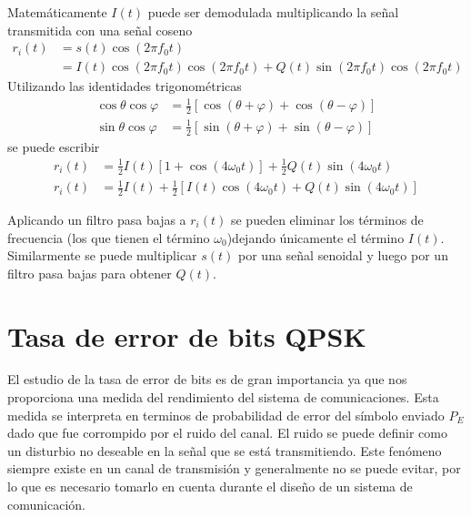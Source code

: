 Matem\'aticamente $I(t)$ puede ser demodulada multiplicando la se\~nal transmitida
con una se\~nal coseno
\begin{equation}
\begin{aligned}
r_i(t)&=s(t)\cos(2\pi f_0t)\\
&=I(t)\cos(2\pi f_0t)\cos(2\pi f_0t)+Q(t)\sin(2\pi f_0t)\cos(2\pi f_0t)
\end{aligned}
\end{equation}
Utilizando las identidades trigonom\'etricas
\begin{equation}
\begin{aligned}
\cos\theta\cos\varphi&=\frac{1}{2}[\cos(\theta+\varphi)+\cos(\theta-\varphi)]\\
\sin\theta\cos\varphi&=\frac{1}{2}[\sin(\theta+\varphi)+\sin(\theta-\varphi)]
\end{aligned}
\end{equation}
se puede escribir
\begin{equation}
\begin{aligned}
r_i(t)&=\frac{1}{2}I(t)[1+\cos(4\omega_0t)]+\frac{1}{2}Q(t)\sin(4\omega_0t)\\
r_i(t)&=\frac{1}{2}I(t)+\frac{1}{2}[I(t)\cos(4\omega_0t)+Q(t)\sin(4\omega_0t)]
\end{aligned}
\end{equation}

Aplicando un filtro pasa bajas a $r_i(t)$ se pueden eliminar los t\'erminos de
frecuencia (los que tienen el t\'ermino $\omega_0$)dejando \'unicamente el
t\'ermino $I(t)$. Similarmente se puede multiplicar $s(t)$ por una se\~nal
senoidal y luego por un filtro pasa bajas para obtener $Q(t)$.

\section{Tasa de error de bits QPSK}
El estudio de la tasa de error de bits es de gran importancia ya que nos proporciona una medida del
rendimiento del sistema de comunicaciones. Esta medida se interpreta en terminos de probabilidad de
error del s\'imbolo enviado $P_E$ dado que fue corrompido por el ruido del canal. El ruido se puede
definir como un disturbio no deseable en la se\~nal que se est\'a transmitiendo. Este fen\'omeno
siempre existe en un canal de transmisi\'on y generalmente no se puede evitar, por lo que es
necesario tomarlo en cuenta durante el dise\~no de un sistema de comunicaci\'on.


